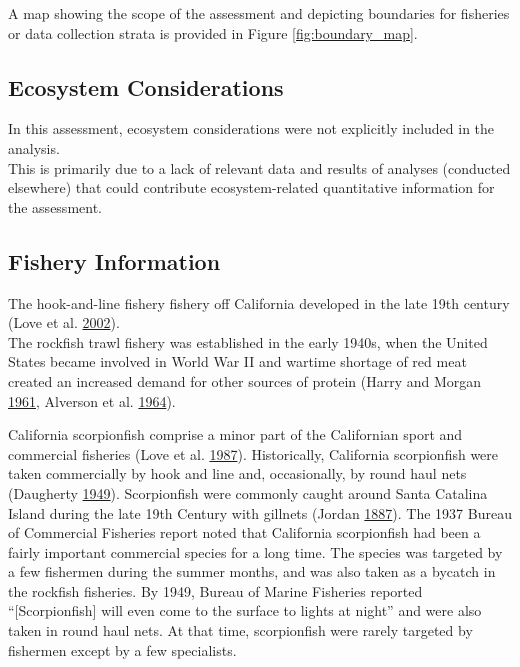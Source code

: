 \documentclass[12pt,]{article}
\begin{document}
A map showing the scope of the assessment and depicting boundaries for
fisheries or data collection strata is provided in Figure
\ref{fig:boundary_map}.

\subsection{Ecosystem Considerations}\label{ecosystem-considerations-1}

In this assessment, ecosystem considerations were not explicitly
included in the analysis.\\
This is primarily due to a lack of relevant data and results of analyses
(conducted elsewhere) that could contribute ecosystem-related
quantitative information for the assessment.

\subsection{Fishery Information}\label{fishery-information}

The hook-and-line fishery fishery off California developed in the late
19th century (Love et al. \protect\hyperlink{ref-Love2002}{2002}).\\
The rockfish trawl fishery was established in the early 1940s, when the
United States became involved in World War II and wartime shortage of
red meat created an increased demand for other sources of protein (Harry
and Morgan \protect\hyperlink{ref-Harry1961}{1961}, Alverson et al.
\protect\hyperlink{ref-Alverson1964}{1964}).

California scorpionfish comprise a minor part of the Californian sport
and commercial fisheries (Love et al.
\protect\hyperlink{ref-Love1987}{1987}). Historically, California
scorpionfish were taken commercially by hook and line and, occasionally,
by round haul nets (Daugherty
\protect\hyperlink{ref-Daugherty1949}{1949}). Scorpionfish were commonly
caught around Santa Catalina Island during the late 19th Century with
gillnets (Jordan \protect\hyperlink{ref-Jordan1887}{1887}). The 1937
Bureau of Commercial Fisheries report noted that California scorpionfish
had been a fairly important commercial species for a long time. The
species was targeted by a few fishermen during the summer months, and
was also taken as a bycatch in the rockfish fisheries. By 1949, Bureau
of Marine Fisheries reported\\
``{[}Scorpionfish{]} will even come to the surface to lights at night''
and were also taken in round haul nets. At that time, scorpionfish were
rarely targeted by fishermen except by a few specialists.
\end{document}
